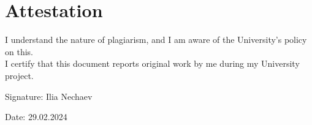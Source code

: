 \section*{Attestation}
\noindent 
I understand the nature of plagiarism, and I am aware of the University’s policy on this.
\\
I certify that this document reports original work by me during my University project.

\vspace{1cm}

\noindent Signature: Ilia Nechaev

\vspace{1cm}

\noindent Date: 29.02.2024
